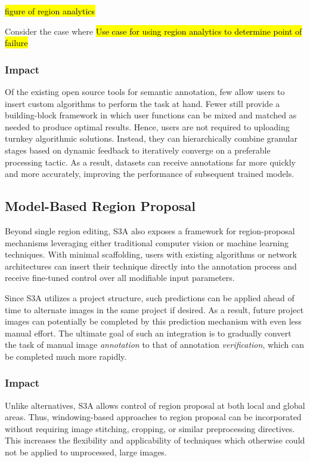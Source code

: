 \hl{figure of region analytics}

Consider the case where \hl{Use case for using region analytics to determine point of failure}

\subsubsection{Impact}
Of the existing open source tools for semantic annotation, few allow users to insert custom algorithms to perform the task at hand. Fewer still provide a building-block framework in which user functions can be mixed and matched as needed to produce optimal results. Hence, users are not required to uploading turnkey algorithmic solutions. Instead, they can hierarchically combine granular stages based on dynamic feedback to iteratively converge on a preferable processing tactic. As a result, datasets can receive annotations far more quickly and more accurately, improving the performance of subsequent trained models.

\subsection{Model-Based Region Proposal}

Beyond single region editing, S3A also exposes a framework for region-proposal mechanisms leveraging either traditional computer vision or machine learning techniques. With minimal scaffolding, users with existing algorithms or network architectures can insert their technique directly into the annotation process and receive fine-tuned control over all modifiable input parameters.

Since S3A utilizes a project structure, such predictions can be applied ahead of time to alternate images in the same project if desired. As a result, future project images can potentially be completed by this prediction mechanism with even less manual effort. The ultimate goal of such an integration is to gradually convert the task of manual image \emph{annotation} to that of annotation \emph{verification}, which can be completed much more rapidly.

\subsubsection{Impact}
Unlike alternatives, S3A allows control of region proposal at both local and global areas. Thus, windowing-based approaches to region proposal can be incorporated without requiring image stitching, cropping, or similar preprocessing directives. This increases the flexibility and applicability of techniques which otherwise could not be applied to unprocessed, large images.

